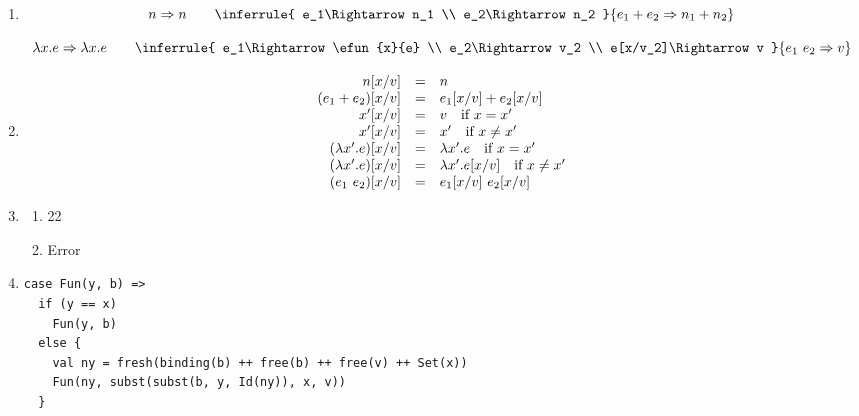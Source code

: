 \textbf{}
\newcommand{\evals}[2]{#1\Rightarrow#2}
\begin{enumerate}
  \item
      \[
        \evals{n}{n}
        \qquad
        \inferrule
        { \evals{e_1}{n_1} \\ \evals{e_2}{n_2} }
        { \evals{\eadd{e_1}{e_2}}{\eadd{n_1}{n_2}} }
      \]

      \[
        \evals{\efun{x}{e}}{\efun{x}{e}}
        \qquad
        \inferrule
        { \evals{e_1}{\efun{x}{e}} \\
          \evals{e_2}{v_2} \\
          \evals{e[x/v_2]}{v} }
        { \evals{\eapp{e_1}{e_2}}{v} }
      \]
  \item
      \[
        \begin{array}{rcl}
          n[x/v] &=& n \\
          (\eadd{e_1}{e_2})[x/v] &=& \eadd{e_1[x/v]}{e_2[x/v]} \\
          x'[x/v] &=& v \quad \text{if}\ x=x' \\
          x'[x/v] &=& x' \quad \text{if}\ x\not=x' \\
          (\efun{x'}{e})[x/v] &=& \efun{x'}{e} \quad \text{if}\ x=x' \\
          (\efun{x'}{e})[x/v] &=& \efun{x'}{e[x/v]} \quad \text{if}\ x\not=x' \\
          (\eapp{e_1}{e_2})[x/v] &=& \eapp{e_1[x/v]}{e_2[x/v]} \\
        \end{array}
      \]
  \item
    \begin{enumerate}
        \item 22
        \item Error
    \end{enumerate}
  \item
\begin{verbatim}
case Fun(y, b) =>
  if (y == x)
    Fun(y, b)
  else {
    val ny = fresh(binding(b) ++ free(b) ++ free(v) ++ Set(x))
    Fun(ny, subst(subst(b, y, Id(ny)), x, v))
  }
\end{verbatim}
\end{enumerate}

